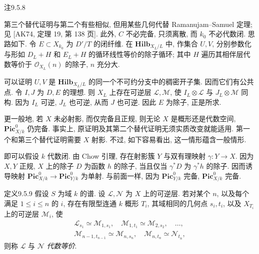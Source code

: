 \begin{origstatement}{注}{9.5.8}

第三个替代证明与第二个有些相似, 但用某些几何代替 Ramanujam--Samuel 定理; 见 [AK74, 定理 19, 第 138 页]. 此外, $C$ 不必完备, 只须离散, 而 $k_0$ 不必代数闭. 思路如下. 令 $E\subset X_{k_0}$ 为 $D'/T$ 的闭纤维. 在 $\mathbf{Hilb}_{X_L/L}$ 中, 作集合 $U,V$, 分别参数化与形如 $D_L+H$ 和 $E_L+H$ 的循环线性等价的除子循环; 其中 $H$ 遍历其相伴层代数等价于 $\mathcal O_{X_L}(n)$ 的除子, $n$ 充分大.

可以证明 $U,V$ 是 $\mathbf{Hilb}_{X_L/L}$ 的同一个不可约分支中的稠密开子集. 因而它们有公共点. 令 $I,J$ 为 $D,E$ 的理想. 则 $X_L$ 上存在可逆层 $\mathcal L,\mathcal M$, 使 $I_L\otimes\mathcal L$ 与 $J_L\otimes\mathcal M$ 同构. 因为 $I_L$ 可逆, $J_L$ 也可逆, 从而 $J$ 也可逆. 因此 $E$ 为除子, 正是所求.

更一般地, 若 $X$ 未必射影, 而仅完备且正规, 则无论 $X$ 是概形还是代数空间, $\mathbf{Pic}^0_{X/k}$ 仍完备. 事实上, 原证明及其第二个替代证明无须实质改变就能适用. 第一个和第三个替代证明需要 $X$ 射影. 不过, 如下容易看出, 这一情形蕴含一般情形.

即可以假设 $k$ 代数闭. 由 Chow 引理, 存在射影簇 $Y$ 与双有理映射 $\gamma:Y\to X$. 因为 $X,Y$ 正规, $X$ 上的除子 $D$ 为函数 $h$ 的除子, 当且仅当 $\gamma^*D$ 为 $\gamma^*h$ 的除子. 因而诱导映射 $\mathbf{Pic}^0_{X/k}\to\mathbf{Pic}^0_{Y/k}$ 为单射. 与前面一样, 因为 $\mathbf{Pic}^0_{Y/k}$ 完备, $\mathbf{Pic}^0_{X/k}$ 完备.
\end{origstatement}

\begin{origstatement}{定义}{9.5.9}\label{ch09s05:def9.5.9}
假设 $S$ 为域 $k$ 的谱. 设 $\mathcal L,\mathcal N$ 为 $X$ 上的可逆层. 若对某个 $n$, 以及每个满足 $1\leq i\leq n$ 的 $i$, 存在有限型连通 $k$ 概形 $T_i$, 其域相同的几何点 $s_i,t_i$, 以及 $X_{T_i}$ 上的可逆层 $\mathcal M_i$, 使
\[
\begin{gathered}
 \mathcal L_{s_1}\simeq\mathcal M_{1,s_1},\quad
 \mathcal M_{1,t_1}\simeq\mathcal M_{2,s_2},\quad\ldots,\\
 \mathcal M_{n-1,t_{n-1}}\simeq\mathcal M_{n,s_n},\quad
 \mathcal M_{n,t_n}\simeq\mathcal N_{t_n},
\end{gathered}
\]
则称 $\mathcal L$ 与 $\mathcal N$ \emph{代数等价}.
\end{origstatement}

